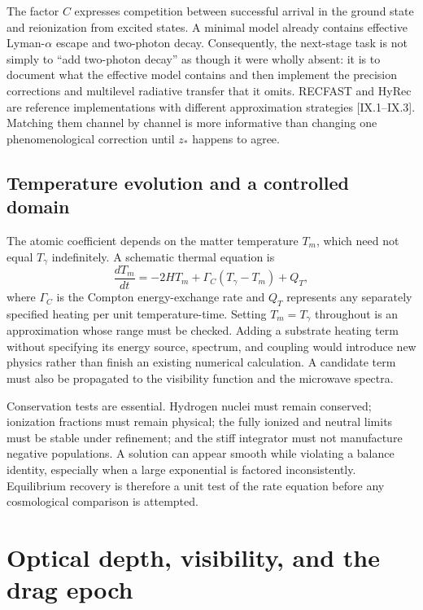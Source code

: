 The factor $C$ expresses competition between successful arrival in the ground state and reionization from excited states. A minimal model already contains effective Lyman-$\alpha$ escape and two-photon decay. Consequently, the next-stage task is not simply to ``add two-photon decay'' as though it were wholly absent: it is to document what the effective model contains and then implement the precision corrections and multilevel radiative transfer that it omits. RECFAST and HyRec are reference implementations with different approximation strategies [IX.1--IX.3]. Matching them channel by channel is more informative than changing one phenomenological correction until $z_*$ happens to agree.

\subsection{Temperature evolution and a controlled domain}

The atomic coefficient depends on the matter temperature $T_m$, which need not equal $T_\gamma$ indefinitely. A schematic thermal equation is
\begin{equation}
 \frac{dT_m}{dt}=-2HT_m+\Gamma_C(T_\gamma-T_m)+Q_T,
 \label{c9:mattertemperature}
\end{equation}
where $\Gamma_C$ is the Compton energy-exchange rate and $Q_T$ represents any separately specified heating per unit temperature-time. Setting $T_m=T_\gamma$ throughout is an approximation whose range must be checked. Adding a substrate heating term without specifying its energy source, spectrum, and coupling would introduce new physics rather than finish an existing numerical calculation. A candidate term must also be propagated to the visibility function and the microwave spectra.

Conservation tests are essential. Hydrogen nuclei must remain conserved; ionization fractions must remain physical; the fully ionized and neutral limits must be stable under refinement; and the stiff integrator must not manufacture negative populations. A solution can appear smooth while violating a balance identity, especially when a large exponential is factored inconsistently. Equilibrium recovery is therefore a unit test of the rate equation before any cosmological comparison is attempted.

\section{Optical depth, visibility, and the drag epoch}

